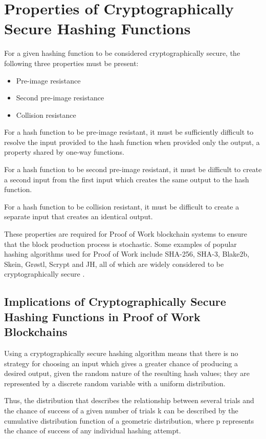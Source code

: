 \documentclass[]{article}
\begin{document}
\section{Properties of Cryptographically Secure Hashing Functions}
For a given hashing function to be considered cryptographically secure, the following three properties \cite{CryptoHashFunctions} must be present: 
\begin{itemize}
	\item Pre-image resistance
	\item Second pre-image resistance
	\item Collision resistance
\end{itemize}

For a hash function to be pre-image resistant, it must be sufficiently difficult to resolve the input provided to the hash function when provided only the output, a property shared by one-way functions.   
\newline 

For a hash function to be second pre-image resistant, it must be difficult to create a second input from the first input which creates the same output to the hash function. 
\newline

For a hash function to be collision resistant, it must be difficult to create a separate input that creates an identical output. 
\newline

These properties are required for Proof of Work blockchain systems to ensure that the block production process is stochastic.  Some examples of popular hashing algorithms used for Proof of Work include SHA-256, SHA-3, Blake2b, Skein, Grøstl, Scrypt and JH, all of which are widely considered to be cryptographically secure \cite{CryptoAlgos}. 

\subsection{Implications of Cryptographically Secure Hashing Functions in Proof of Work Blockchains}
Using a cryptographically secure hashing algorithm means that there is no strategy for choosing an input which gives a greater chance of producing a desired output, given the random nature of the resulting hash values; they are represented by a discrete random variable with a uniform distribution.  
\newline

Thus, the distribution that describes the relationship between several trials and the chance of success of a given number of trials k can be described by the cumulative distribution function of a geometric distribution, where p represents the chance of success of any individual hashing attempt.   
\end{document}
